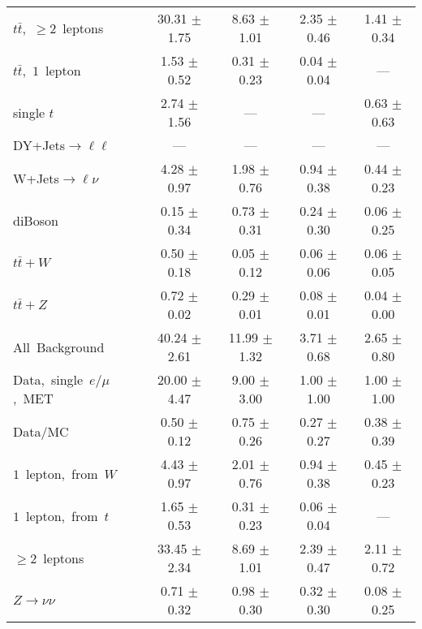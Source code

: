 \documentclass{article}
\begin{document}
\begin{longtable}{|l|c|c|c|c|}
$t\bar{t}$,~$\ge2$~leptons & 30.31 $\pm$ 1.75  & 8.63 $\pm$ 1.01  & 2.35 $\pm$ 0.46  & 1.41 $\pm$ 0.34 \\* 
$t\bar{t}$,~$1$~lepton & 1.53 $\pm$ 0.52  & 0.31 $\pm$ 0.23  & 0.04 $\pm$ 0.04  & --- \\* 
single $t$  & 2.74 $\pm$ 1.56  & ---  & ---  & 0.63 $\pm$ 0.63 \\* 
DY+Jets$\rightarrow\ell\ell$  & ---  & ---  & ---  & --- \\* 
W+Jets$\rightarrow\ell\nu$  & 4.28 $\pm$ 0.97  & 1.98 $\pm$ 0.76  & 0.94 $\pm$ 0.38  & 0.44 $\pm$ 0.23 \\* 
diBoson  & 0.15 $\pm$ 0.34  & 0.73 $\pm$ 0.31  & 0.24 $\pm$ 0.30  & 0.06 $\pm$ 0.25 \\* 
$t\bar{t}+W$  & 0.50 $\pm$ 0.18  & 0.05 $\pm$ 0.12  & 0.06 $\pm$ 0.06  & 0.06 $\pm$ 0.05 \\* 
$t\bar{t}+Z$  & 0.72 $\pm$ 0.02  & 0.29 $\pm$ 0.01  & 0.08 $\pm$ 0.01  & 0.04 $\pm$ 0.00 \\* 
\hline \hline 
All~Background  & 40.24 $\pm$ 2.61  & 11.99 $\pm$ 1.32  & 3.71 $\pm$ 0.68  & 2.65 $\pm$ 0.80 \\* 
Data,~single~$e/\mu$,~MET  & 20.00 $\pm$ 4.47  & 9.00 $\pm$ 3.00  & 1.00 $\pm$ 1.00  & 1.00 $\pm$ 1.00 \\* 
Data/MC  & 0.50 $\pm$ 0.12  & 0.75 $\pm$ 0.26  & 0.27 $\pm$ 0.27  & 0.38 $\pm$ 0.39 \\* 
\hline \hline 
$1$~lepton,~from~$W$  & 4.43 $\pm$ 0.97  & 2.01 $\pm$ 0.76  & 0.94 $\pm$ 0.38  & 0.45 $\pm$ 0.23 \\* 
$1$~lepton,~from~$t$  & 1.65 $\pm$ 0.53  & 0.31 $\pm$ 0.23  & 0.06 $\pm$ 0.04  & --- \\* 
$\ge2$~leptons  & 33.45 $\pm$ 2.34  & 8.69 $\pm$ 1.01  & 2.39 $\pm$ 0.47  & 2.11 $\pm$ 0.72 \\* 
$Z\rightarrow\nu\nu$  & 0.71 $\pm$ 0.32  & 0.98 $\pm$ 0.30  & 0.32 $\pm$ 0.30  & 0.08 $\pm$ 0.25 \\* 
\hline 
\end{longtable} 

 
 
 
 
\pagebreak 

 
 
 
 
\end{document}
